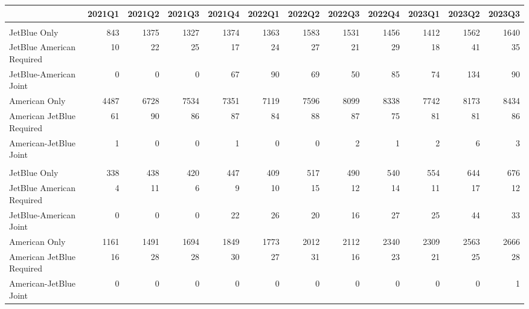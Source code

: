 
\begin{tabular}[t]{lrrrrrrrrrrr}
\toprule
 & 2021Q1 & 2021Q2 & 2021Q3 & 2021Q4 & 2022Q1 & 2022Q2 & 2022Q3 & 2022Q4 & 2023Q1 & 2023Q2 & 2023Q3\\
\midrule
\addlinespace[0.3em]
\multicolumn{12}{l}{\textbf{All Markets}}\\
\hspace{1em}JetBlue Only & 843 & 1375 & 1327 & 1374 & 1363 & 1583 & 1531 & 1456 & 1412 & 1562 & 1640\\
\hspace{1em}JetBlue American Required & 10 & 22 & 25 & 17 & 24 & 27 & 21 & 29 & 18 & 41 & 35\\
\hspace{1em}JetBlue-American Joint & 0 & 0 & 0 & 67 & 90 & 69 & 50 & 85 & 74 & 134 & 90\\
\hspace{1em}American Only & 4487 & 6728 & 7534 & 7351 & 7119 & 7596 & 8099 & 8338 & 7742 & 8173 & 8434\\
\hspace{1em}American JetBlue Required & 61 & 90 & 86 & 87 & 84 & 88 & 87 & 75 & 81 & 81 & 86\\
\hspace{1em}American-JetBlue Joint & 1 & 0 & 0 & 1 & 0 & 0 & 2 & 1 & 2 & 6 & 3\\
\addlinespace[0.3em]
\multicolumn{12}{l}{\textbf{Spirit Markets}}\\
\hspace{1em}JetBlue Only & 338 & 438 & 420 & 447 & 409 & 517 & 490 & 540 & 554 & 644 & 676\\
\hspace{1em}JetBlue American Required & 4 & 11 & 6 & 9 & 10 & 15 & 12 & 14 & 11 & 17 & 12\\
\hspace{1em}JetBlue-American Joint & 0 & 0 & 0 & 22 & 26 & 20 & 16 & 27 & 25 & 44 & 33\\
\hspace{1em}American Only & 1161 & 1491 & 1694 & 1849 & 1773 & 2012 & 2112 & 2340 & 2309 & 2563 & 2666\\
\hspace{1em}American JetBlue Required & 16 & 28 & 28 & 30 & 27 & 31 & 16 & 23 & 21 & 25 & 28\\
\hspace{1em}American-JetBlue Joint & 0 & 0 & 0 & 0 & 0 & 0 & 0 & 0 & 0 & 0 & 1\\
\bottomrule
\end{tabular}
